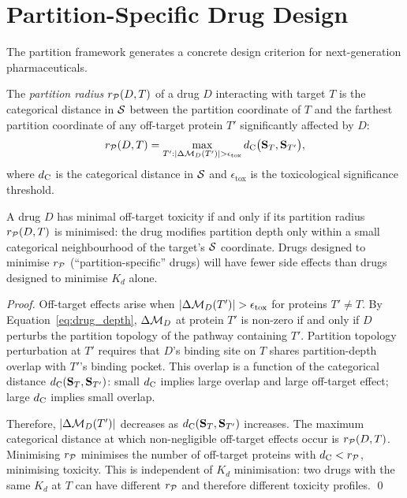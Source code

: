 \section{Partition-Specific Drug Design}
\label{sec:partition_drug_design}

The partition framework generates a concrete design criterion for next-generation
pharmaceuticals.

\begin{definition}
\label{def:partition_radius}
The \emph{partition radius} $r_{\mathcal{P}}(D, T)$ of a drug $D$ interacting with
target $T$ is the categorical distance in $\mathcal{S}$ between the partition
coordinate of $T$ and the farthest partition coordinate of any off-target
protein $T'$ significantly affected by $D$:
\begin{equation}
  r_{\mathcal{P}}(D, T) = \max_{T': |\Delta\mathcal{M}_D(T')| > \epsilon_{\mathrm{tox}}} d_{\mathrm{C}}\bigl(\mathbf{S}_T, \mathbf{S}_{T'}\bigr),
  \label{eq:partition_radius}
\end{equation}
where $d_{\mathrm{C}}$ is the categorical distance in $\mathcal{S}$ and $\epsilon_{\mathrm{tox}}$
is the toxicological significance threshold.
\end{definition}

\begin{theorem}
\label{thm:partition_drug_design}
A drug $D$ has minimal off-target toxicity if and only if its partition radius
$r_{\mathcal{P}}(D, T)$ is minimised: the drug modifies partition depth only within a
small categorical neighbourhood of the target's $\mathcal{S}$ coordinate. Drugs
designed to minimise $r_{\mathcal{P}}$ (``partition-specific'' drugs) will have fewer
side effects than drugs designed to minimise $K_d$ alone.
\end{theorem}

\begin{proof}
Off-target effects arise when $|\Delta\mathcal{M}_D(T')| > \epsilon_{\mathrm{tox}}$
for proteins $T' \neq T$. By Equation~\eqref{eq:drug_depth}, $\Delta\mathcal{M}_D$
at protein $T'$ is non-zero if and only if $D$ perturbs the partition topology
of the pathway containing $T'$. Partition topology perturbation at $T'$
requires that $D$'s binding site on $T$ shares partition-depth overlap with
$T'$'s binding pocket. This overlap is a function of the categorical distance
$d_{\mathrm{C}}(\mathbf{S}_T, \mathbf{S}_{T'})$: small $d_{\mathrm{C}}$ implies large overlap and large
off-target effect; large $d_{\mathrm{C}}$ implies small overlap.

Therefore, $|\Delta\mathcal{M}_D(T')|$ decreases as $d_{\mathrm{C}}(\mathbf{S}_T, \mathbf{S}_{T'})$
increases. The maximum categorical distance at which non-negligible off-target
effects occur is $r_{\mathcal{P}}(D, T)$. Minimising $r_{\mathcal{P}}$ minimises the number
of off-target proteins with $d_{\mathrm{C}} < r_{\mathcal{P}}$, minimising toxicity. This is
independent of $K_d$ minimisation: two drugs with the same $K_d$ at $T$ can
have different $r_{\mathcal{P}}$ and therefore different toxicity profiles. \qed
\end{proof}


